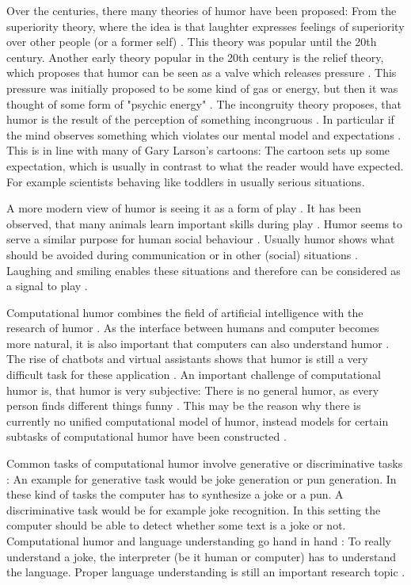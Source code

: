\documentclass[draft,final,oneside]{vutinfth} %
\begin{document}
Over the centuries, there many theories of humor have been proposed: From the superiority theory, where the idea is that laughter expresses feelings of superiority over other people (or a former self) \cite{humorresearch}. This theory was popular until the 20th century. Another early theory popular in the 20th century is the relief theory, which proposes that humor can be seen as a valve which releases pressure \cite{humorresearch}. This pressure was initially proposed to be some kind of gas or energy, but then it was thought of some form of "psychic energy" \cite{sep-humor}\cite{humorresearch}. The incongruity theory proposes, that humor is the result of the perception of something incongruous \cite{typologyofhumor}. In particular if the mind observes something which violates our mental model and expectations \cite{typologyofhumor}. This is in line with many of Gary Larson's cartoons: The cartoon sets up some expectation, which is usually in contrast to what the reader would have expected. For example scientists behaving like toddlers in usually serious situations. 

A more modern view of humor is seeing it as a form of play \cite{sep-humor}. It has been observed, that many animals learn important skills during play \cite{sep-humor}. Humor seems to serve a similar purpose for human social behaviour \cite{humorplay}. Usually humor shows what should be avoided during communication or in other (social) situations \cite{sep-humor}. Laughing and smiling enables these situations and therefore can be considered as a signal to play \cite{humorplay}. 

Computational humor combines the field of artificial intelligence with the research of humor \cite{comphumordirections}. As the interface between humans and computer becomes more natural, it is also important that computers can also understand humor \cite{HumoristBot}. The rise of chatbots and virtual assistants shows that humor is still a very difficult task for these application \cite{HumoristBot}. An important challenge of computational humor is, that humor is very subjective: There is no general humor, as every person finds different things funny \cite{humorresearch}. This may be the reason why there is currently no unified computational model of humor, instead models for certain subtasks of computational humor have been constructed \cite{Yang2015HumorRA}\cite{Bertero2016DeepLO}.

Common tasks of computational humor involve generative or discriminative tasks \cite{HumoristBot}\cite{Yang2015HumorRA}: An example for generative task would be joke generation or pun generation. In these kind of tasks the computer has to synthesize a joke or a pun. A discriminative task would be for example joke recognition. In this setting the computer should be able to detect whether some text is a joke or not. Computational humor and language understanding go hand in hand \cite{Yang2015HumorRA}: To really understand a joke, the interpreter (be it human or computer) has to understand the language. Proper language understanding is still an important research topic \cite{elmo}\cite{bert}.
\end{document}
